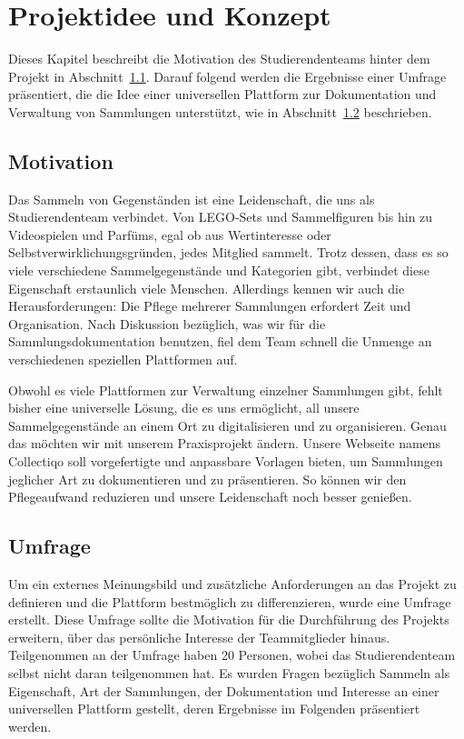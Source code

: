 \section{Projektidee und Konzept}\label{sec:projektidee-und-konzept}

Dieses Kapitel beschreibt die Motivation des Studierendenteams hinter dem Projekt in Abschnitt~\ref{subsec:motivation}.
Darauf folgend werden die Ergebnisse einer Umfrage präsentiert, die die Idee einer universellen Plattform zur Dokumentation und Verwaltung von Sammlungen unterstützt, wie in Abschnitt~\ref{subsec:umfrage} beschrieben.

\subsection{Motivation}\label{subsec:motivation}


Das Sammeln von Gegenständen ist eine Leidenschaft, die uns als Studierendenteam verbindet.
Von LEGO-Sets und Sammelfiguren bis hin zu Videospielen und Parfüms, egal ob aus Wertinteresse oder Selbstverwirklichungsgründen, jedes Mitglied sammelt.
Trotz dessen, dass es so viele verschiedene Sammelgegenstände und Kategorien gibt, verbindet diese Eigenschaft erstaunlich viele Menschen.
Allerdings kennen wir auch die Herausforderungen: Die Pflege mehrerer Sammlungen erfordert Zeit und Organisation.
Nach Diskussion bezüglich, was wir für die Sammlungsdokumentation benutzen, fiel dem Team schnell die Unmenge an verschiedenen speziellen Plattformen auf. \par
Obwohl es viele Plattformen zur Verwaltung einzelner Sammlungen gibt, fehlt bisher eine universelle Lösung, die es uns ermöglicht, all unsere Sammelgegenstände an einem Ort zu digitalisieren und zu organisieren.
Genau das möchten wir mit unserem Praxisprojekt ändern.
Unsere Webseite namens Collectiqo soll vorgefertigte und anpassbare Vorlagen bieten, um Sammlungen jeglicher Art zu dokumentieren und zu präsentieren.
So können wir den Pflegeaufwand reduzieren und unsere Leidenschaft noch besser genießen.


\subsection{Umfrage}\label{subsec:umfrage}

Um ein externes Meinungsbild und zusätzliche Anforderungen an das Projekt zu definieren und die Plattform bestmöglich zu differenzieren, wurde eine Umfrage erstellt.
Diese Umfrage sollte die Motivation für die Durchführung des Projekts erweitern, über das persönliche Interesse der Teammitglieder hinaus.
Teilgenommen an der Umfrage haben 20 Personen, wobei das Studierendenteam selbst nicht daran teilgenommen hat.
Es wurden Fragen bezüglich Sammeln als Eigenschaft, Art der Sammlungen, der Dokumentation und Interesse an einer universellen Plattform gestellt, deren Ergebnisse im Folgenden präsentiert werden.

